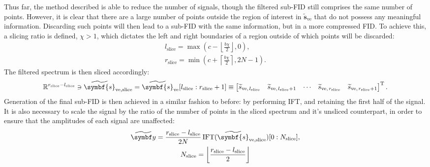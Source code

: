 Thus far, the method described is able to reduce the number of signals,
though the filtered sub-\ac{FID} still comprises the same number of points.
However, it is clear that there are a large number of points outside the region
of interest in $\widetilde{\symbf{s}}_{\text{ve}}$ that do not possess any
meaningful information. Discarding such points will then lead to a sub-\ac{FID}
with the same information, but in a more compressed \ac{FID}. To achieve this,
a slicing ratio is defined, $\chi > 1$, which dictates the
left and right boundaries of a region outside of which points will be discarded:
\begin{subequations}
    \begin{gather}
        l_{\text{slice}} = \max\left(
            c - \left \lfloor \frac{b \chi}{2} \right \rfloor, 0
            \right),\\
        r_{\text{slice}} = \min\left(
            c + \left \lceil \frac{b \chi}{2} \right \rceil, 2N - 1
            \right).
    \end{gather}
\end{subequations}
The filtered spectrum is then sliced accordingly:
\begin{equation}
    \mathbb{R}^{r_{\text{slice}} - l_{\text{slice}}} \ni
    \widetilde{\symbf{s}}_{\text{ve,slice}} =
    \widetilde{\symbf{s}}_{\text{ve}}[l_{\text{slice}} : r_{\text{slice}} + 1] \equiv
    \begin{bmatrix}
        \widetilde{s}_{\text{ve},\hspace*{1pt}l_{\text{slice}}} &
        \widetilde{s}_{\text{ve},\hspace*{1pt}l_{\text{slice}} + 1} &
        \cdots &
        \widetilde{s}_{\text{ve},\hspace*{1pt}r_{\text{slice}}} &
        \widetilde{s}_{\text{ve},\hspace*{1pt}r_{\text{slice}} + 1}
    \end{bmatrix}\T.
\end{equation}
Generation of the final sub-\ac{FID} is then achieved in a similar fashion to
before: by performing \ac{IFT}, and retaining the first half of the signal.
It is also necessary to scale the signal by the ratio of the number of points
in the sliced spectrum and it's unsliced counterpart, in order to ensure that
the amplitudes of each signal are unaffected:
\begin{subequations}
    \begin{gather}
        \widetilde{\by} =
            \frac{r_{\text{slice}} - l_{\text{slice}}}{2N}
            \IFT(\widetilde{\symbf{s}}_{\text{ve,slice}})
            [0 : N_{\text{slice}}],\\
            N_{\text{slice}} = \left \lfloor \frac{r_{\text{slice}} - l_{\text{slice}}}{2} \right \rfloor
    \end{gather}
\end{subequations}
